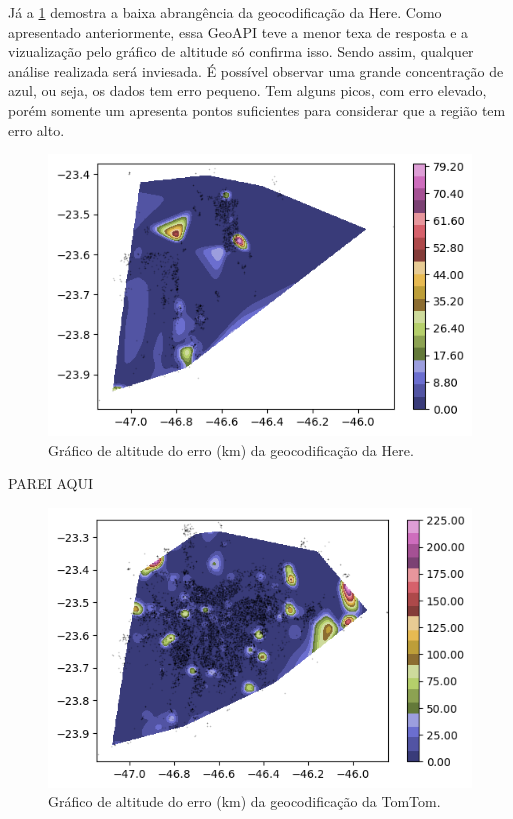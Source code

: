 Já a \ref{fig:grafAltH} demostra a baixa abrangência da geocodificação da Here. Como apresentado anteriormente, essa GeoAPI teve a menor texa de resposta e a vizualização pelo gráfico de altitude só confirma isso. Sendo assim, qualquer análise realizada será inviesada. É possível observar uma grande concentração de azul, ou seja, os dados tem erro pequeno. Tem alguns picos, com erro elevado, porém somente um apresenta pontos suficientes para considerar que a região tem erro alto. 

\begin{figure}[h]
  \centering
  \includegraphics[width=\textwidth]{Figuras/graficoAltPontosHere.png}
  \caption{Gráfico de altitude do erro (km) da geocodificação da Here.}
  \label{fig:grafAltH}
\end{figure}

PAREI AQUI
\begin{figure}[h]
  \centering
  \includegraphics[width=\textwidth]{Figuras/graficoAltPontosTomtom.png}
  \caption{Gráfico de altitude do erro (km) da geocodificação da TomTom.}
  \label{fig:grafAltT}
\end{figure}